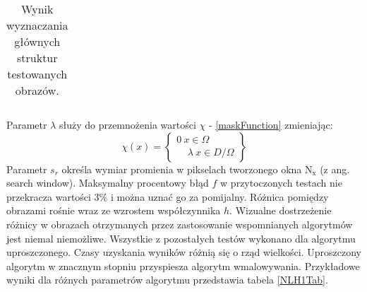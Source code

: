 \documentclass[12pt, twoside, openany]{report}
\theoremstyle{definition}
\begin{document}
\begin{longtable}[h!]{|c|c|}
	\caption{Wynik wyznaczania głównych struktur testowanych obrazów.}
	\label{NLCTVVSNLHI}
\end{longtable}
Parametr $\lambda$ służy do przemnożenia wartości $\chi$ - \eqref{maskFunction} zmieniając:
\begin{equation}
\chi \left(x\right)=\left\{ \begin{array}{c}
0\ x \in \Omega \\ 
\ \ \ \ \ \lambda\ x \in D/ \Omega \end{array}
\right\}
\end{equation}
Parametr $s_r$ określa wymiar promienia w pikselach tworzonego okna $\mathrm{N_x}$ (z ang. search window).
Maksymalny procentowy błąd $f$ w przytoczonych testach nie przekracza wartości 3\% i można uznać go za pomijalny. Różnica pomiędzy obrazami rośnie wraz ze wzrostem współczynnika $h$. Wizualne dostrzeżenie różnicy w obrazach otrzymanych przez zastosowanie wspomnianych algorytmów jest niemal niemożliwe. Wszystkie z pozostałych testów wykonano dla algorytmu uproszczonego. Czasy uzyskania wyników różnią się o rząd wielkości. Uproszczony algorytm w znacznym stopniu przyspiesza algorytm wmalowywania. Przykładowe wyniki dla różnych parametrów algorytmu przedstawia tabela \autoref{NLH1Tab}.
\end{document}
